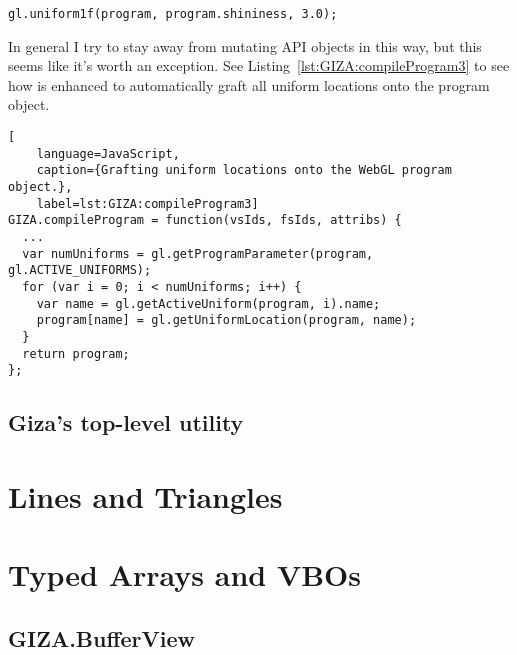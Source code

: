 \begin{lstlisting}
gl.uniform1f(program, program.shininess, 3.0);
\end{lstlisting}

In general I try to stay away from mutating API objects in this way, but this seems like it's worth an exception.  See Listing~\ref{lst:GIZA:compileProgram3} to see how  is enhanced to automatically graft all uniform locations onto the program object.

\begin{lstlisting}[
    language=JavaScript,
    caption={Grafting uniform locations onto the WebGL program object.},
    label=lst:GIZA:compileProgram3]
GIZA.compileProgram = function(vsIds, fsIds, attribs) {
  ...
  var numUniforms = gl.getProgramParameter(program, gl.ACTIVE_UNIFORMS);
  for (var i = 0; i < numUniforms; i++) {
    var name = gl.getActiveUniform(program, i).name;
    program[name] = gl.getUniformLocation(program, name);
  }
  return program;
};
\end{lstlisting}

\subsection{Giza's top-level  utility}


\section{Lines and Triangles}

\section{Typed Arrays and VBOs}
\label{sec:VBOs}


\subsection{GIZA.BufferView}


